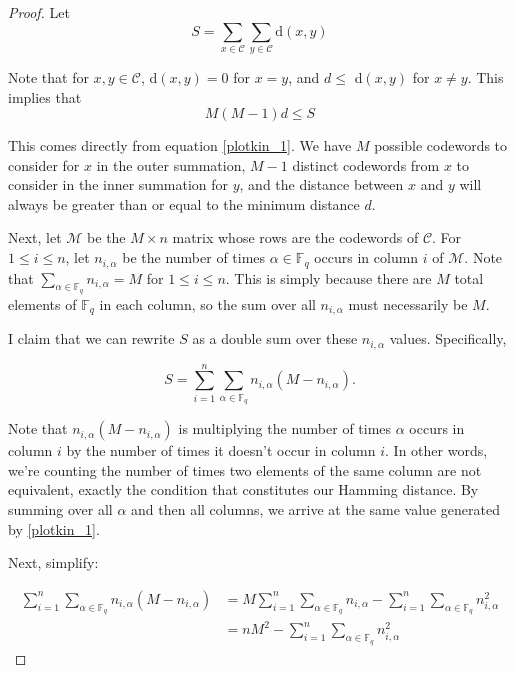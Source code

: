 \documentclass{article}
\numberwithin{theorem}{subsection}
\theoremstyle{definition}
\numberwithin{exmp}{subsection}
\theoremstyle{definition}
\numberwithin{defn}{subsection}
\theoremstyle{definition}
\numberwithin{claim}{subsection}
\begin{document}
\begin{proof}
Let 
\begin{equation} \label{plotkin_1}
S = \sum_{x \in \mathcal{C}} \sum_{y \in \mathcal{C}} \text{d}(x,y)
\end{equation}

Note that for $x,y \in \mathcal{C}$, d$(x,y)=0$ for $x=y$, and $d \le$ d$(x,y)$ for $x\neq y$.  This implies that
\begin{equation} \label{plotkin_1_5}
M(M-1)d\le S
\end{equation}

This comes directly from equation \ref{plotkin_1}.  We have $M$ possible codewords to consider for $x$ in the outer summation, $M-1$ distinct codewords from $x$ to consider in the inner summation for $y$, 
and the distance between $x$ and $y$ will always be greater than or equal to the minimum distance $d$.

Next, let $\mathcal{M}$ be the $M \times n$ matrix whose rows are the codewords of $\mathcal{C}$.  For $1 \le i \le n$, let $n_{i,\alpha}$ be the number of times $\alpha \in
 \mathbb{F}_q$ occurs in column $i$ of $\mathcal{M}$.  Note that $\sum_{\alpha \in \mathbb{F}_q} n_{i,\alpha} = M$ for $1\le i \le n$.  This is simply because there are $M$ total
 elements of $\mathbb{F}_q$ in each column, so the sum over all $n_{i,\alpha}$ must necessarily be $M$.  

I claim that we can rewrite $S$ as a double sum over these $n_{i,\alpha}$ values.  Specifically,

\begin{equation}
S = \sum_{i=1}^{n} \sum_{\alpha\in\mathbb{F}_q} n_{i,\alpha}(M - n_{i,\alpha}).
\end{equation}

Note that $n_{i,\alpha}(M - n_{i,\alpha})$ is multiplying the number of times $\alpha$ occurs in column $i$ by the number of times it doesn't occur in column $i$.  In other words, we're counting the number of times two elements of the same
column are not equivalent, exactly the condition that constitutes our Hamming distance.   By summing over all $\alpha$ and then all columns, we arrive at the same value generated by \ref{plotkin_1}.

Next, simplify:

\begin{equation}
\begin{split}
\sum_{i=1}^{n} \sum_{\alpha\in\mathbb{F}_q} n_{i,\alpha}(M - n_{i,\alpha}) &= M\sum_{i=1}^{n} \sum_{\alpha\in\mathbb{F}_q} n_{i,\alpha} - \sum_{i=1}^{n} \sum_{\alpha\in\mathbb{F}_q} n_{i,\alpha}^2 \\
&= nM^2 - \sum_{i=1}^{n} \sum_{\alpha\in\mathbb{F}_q} n_{i,\alpha}^2
\end{split}
\end{equation}


\end{proof}
\end{document}
